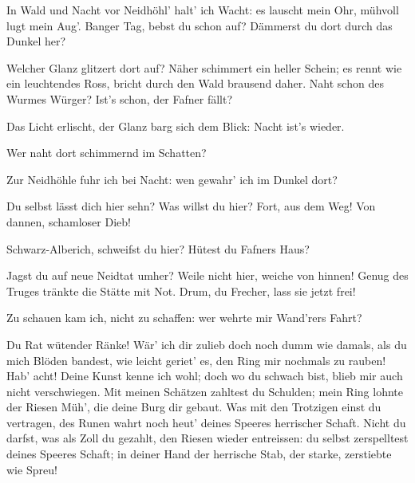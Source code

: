 \begin{drama}
In Wald und Nacht
vor Neidhöhl' halt' ich Wacht:
es lauscht mein Ohr,
mühvoll lugt mein Aug'.
Banger Tag,
bebst du schon auf?
Dämmerst du dort
durch das Dunkel her?


Welcher Glanz glitzert dort auf?
Näher schimmert
ein heller Schein;
es rennt wie ein leuchtendes Ross,
bricht durch den Wald
brausend daher.
Naht schon des Wurmes Würger?
Ist's schon, der Fafner fällt?


Das Licht erlischt,
der Glanz barg sich dem Blick:
Nacht ist's wieder.


Wer naht dort schimmernd im Schatten?

\Wandererspeaks

Zur Neidhöhle
fuhr ich bei Nacht:
wen gewahr' ich im Dunkel dort?


\Alberichspeaks


Du selbst lässt dich hier sehn?
Was willst du hier?
Fort, aus dem Weg!
Von dannen, schamloser Dieb!

\Wandererspeaks


Schwarz-Alberich,
schweifst du hier?
Hütest du Fafners Haus?

\Alberichspeaks

Jagst du auf neue
Neidtat umher?
Weile nicht hier,
weiche von hinnen!
Genug des Truges
tränkte die Stätte mit Not.
Drum, du Frecher,
lass sie jetzt frei!

\Wandererspeaks

Zu schauen kam ich,
nicht zu schaffen:
wer wehrte mir Wand'rers Fahrt?

\Alberichspeaks


Du Rat wütender Ränke!
Wär' ich dir zulieb
doch noch dumm wie damals,
als du mich Blöden bandest,
wie leicht geriet' es,
den Ring mir nochmals zu rauben!
Hab' acht! Deine Kunst
kenne ich wohl;
doch wo du schwach bist,
blieb mir auch nicht verschwiegen.
Mit meinen Schätzen
zahltest du Schulden;
mein Ring lohnte
der Riesen Müh',
die deine Burg dir gebaut.
Was mit den Trotzigen
einst du vertragen,
des Runen wahrt noch heut'
deines Speeres herrischer Schaft.
Nicht du darfst,
was als Zoll du gezahlt,
den Riesen wieder entreissen:
du selbst zerspelltest
deines Speeres Schaft;
in deiner Hand
der herrische Stab,
der starke, zerstiebte wie Spreu!


\end{drama}
